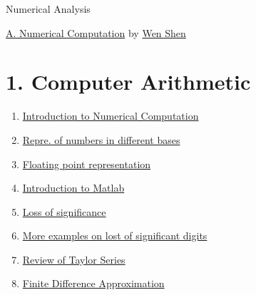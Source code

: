 \documentclass[11pt]{article}
\begin{document}
	\kaishu 
	\setcounter{section}{0}
	\begin{center}
		{\LARGE  Numerical Analysis}
		
		
	\end{center}
\setcounter{page}{1}


\begin{center}
	{\Large \href{https://www.youtube.com/playlist?list=PLbxFfU5GKZz3D4NPYvvY7dvXiZ0awd4zn}{A. Numerical Computation}} {\large by \href{https://sites.psu.edu/wxs27/}{Wen Shen}}
\end{center}

\vspace{-1cm}

\section*{1. Computer Arithmetic}

\vspace{-0.5cm}

\begin{multicols}{2}
	\begin{enumerate}
		\item \href{https://mp.weixin.qq.com/s/cgsyPIr7w-fEbRACNE1ezg}{Introduction to Numerical Computation}	%
		\item \href{https://mp.weixin.qq.com/s/QCssJJjJ8xno2kND1BAYaA}{Repre. of numbers in different bases}	%
		\item \href{https://mp.weixin.qq.com/s/iWqrQSD0Gqr8DKG2GydUbQ}{Floating point representation}	%
		\item \href{https://mp.weixin.qq.com/s/9Tj0u32iptv76BmdE0pMOA}{Introduction to Matlab}	%
		\item \href{https://mp.weixin.qq.com/s/U4CjxHjiI_Xng5sTcorRVQ}{Loss of significance}	%
		\item \href{https://mp.weixin.qq.com/s/hny_RovdEhvd1qBYzPRr8g}{More examples on lost of significant digits}	%
		\item \href{https://mp.weixin.qq.com/s/VjbfnKxb1SXusT-z9vVFYw}{Review of Taylor Series}	%
		\item \href{https://mp.weixin.qq.com/s/sM24GvqIp8F-Q6NAfz0iGQ}{Finite Difference Approximation}	%
	\end{enumerate}
\end{multicols}
\end{document}
